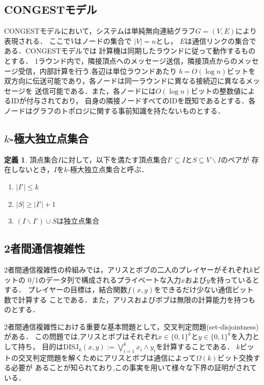\documentclass[a4j,twoside]{jarticle}
\newcommand{\CONGEST}{\textsf{CONGEST}}
\theoremstyle{definition}
\newtheorem{definition}{定義}
\begin{document}
\begin{論文概要}
\subsection{{\CONGEST}モデル}
{\CONGEST}モデルにおいて，システムは単純無向連結グラフ$G =  (V,E)$により表現される．
ここで$V$はノードの集合で $|V| = n$とし， $E$は通信リンクの集合である．{\CONGEST}モデルでは
計算機は同期したラウンドに従って動作するものとする．
1ラウンド内で，隣接頂点へのメッセージ送信，隣接頂点からのメッセージ受信，内部計算を行う.各辺は単位ラウンドあたり
$b = O(\log n)$ビットを双方向に伝送可能であり，各ノードは同一ラウンドに異なる接続辺に異なるメッセージを
送信可能である．また，各ノードには$O(\log n)$ビットの整数値によるIDが付与されており，
自身の隣接ノードすべてのIDを既知であるとする．各ノードはグラフのトポロジに関する事前知識を持たないものとする．

\subsection{$k$-極大独立点集合}
\begin{definition}
頂点集合$I$に対して，以下を満たす頂点集合$I' \subseteq I$と$S\subseteq V \backslash I$のペアが
存在しないとき，$I$を$k$-極大独立点集合と呼ぶ．
\begin{enumerate}
\item $|I'| \leq k$
\item $|S| \geq |I'| + 1$
\item $(I \backslash I') \cup S$は独立点集合
\end{enumerate}
\end{definition}

\subsection{2者間通信複雑性}
2者間通信複雑性の枠組みでは，アリスとボブの二人のプレイヤーがそれぞれ$k$ビットの
0/1のデータ列で構成されるプライベートな入力$x$および$y$を持っているとする．
プレイヤーの目標は，結合関数$f(x,y)$をできるだけ少ない通信ビット数で計算する
ことである．また，アリスおよびボブは無限の計算能力を持つものとする．

2者間通信複雑性における重要な基本問題として，交叉判定問題(set-disjointness)がある．
この問題では,アリスとボブはそれぞれ$x \in \{0, 1\}^{k}$と$y \in \{0, 1\}^{k}$を入力として持ち，
目的は$\mathrm{DISJ}_{k} (x, y) :=\bigvee_{i = 1}^{k} x_{i} \land y_{i}$を計算することである．
$k$ビットの交叉判定問題を解くためにアリスとボブは通信によって$\Omega(k)$ビット交換する必要が
あることが知られており,この事実を用いて様々な下界の証明がされている．


\end{論文概要}
\end{document}

